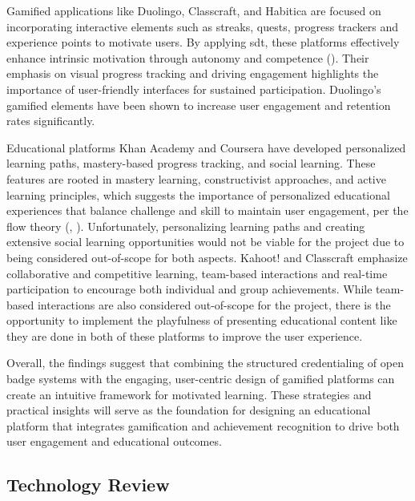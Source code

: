 Gamified applications like Duolingo, Classcraft, and Habitica are focused on incorporating interactive elements such as streaks, quests, progress trackers and experience points to motivate users. 
By applying \acrshort{sdt}, these platforms effectively enhance intrinsic motivation through autonomy and competence (\cite{sdt}). 
Their emphasis on visual progress tracking and driving engagement highlights the importance of user-friendly interfaces for sustained participation. 
Duolingo’s gamified elements have been shown to increase user engagement and retention rates significantly.

Educational platforms Khan Academy and Coursera have developed personalized learning paths, mastery-based progress tracking, and social learning. 
These features are rooted in mastery learning, constructivist approaches, and active learning principles, which suggests the importance of personalized educational experiences that balance challenge and skill to maintain user engagement, per the flow theory (\cite{flow}, \cite{powerFeedback}). 
Unfortunately, personalizing learning paths and creating extensive social learning opportunities would not be viable for the project due to being considered out-of-scope for both aspects. 
Kahoot! and Classcraft emphasize collaborative and competitive learning, team-based interactions and real-time participation to encourage both individual and group achievements. 
While team-based interactions are also considered out-of-scope for the project, there is the opportunity to implement the playfulness of presenting educational content like they are done in both of these platforms to improve the user experience.

Overall, the findings suggest that combining the structured credentialing of open badge systems with the engaging, user-centric design of gamified platforms can create an intuitive framework for motivated learning. 
These strategies and practical insights will serve as the foundation for designing an educational platform that integrates gamification and achievement recognition to drive both user engagement and educational outcomes.

\subsection{Technology Review}

